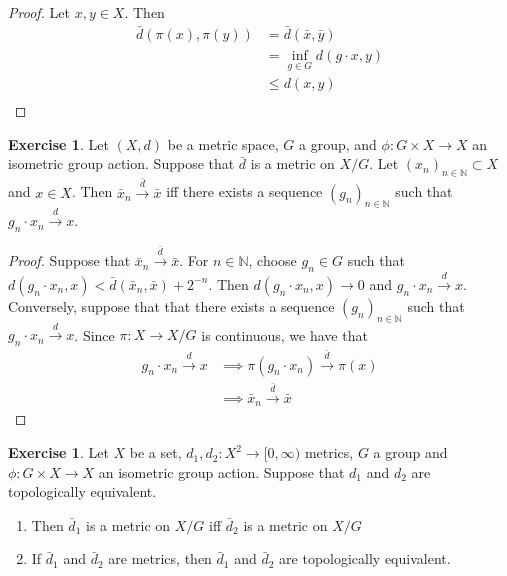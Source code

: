 \documentclass[12pt]{amsart}
\theoremstyle{definition}
\newtheorem{ex}[definition]{Exercise}
\newcommand{\N}{\mathbb{N}}
\newcommand{\Rg}{[0,\infty)}
\newcommand{\conv}[1]{\xrightarrow{#1}}
\DeclareMathOperator*{\0}{\mbf{0}}
\DeclareMathOperator*{\1}{\mbf{1}}
\newcommand{\lex}[1]{\label{ex:#1}}
\begin{document}
	\begin{proof}
	Let $x,y \in X$. Then
	\begin{align*}
	\bar{d}(\pi(x), \pi(y)) 
	&= \bar{d}(\bar{x}, \bar{y}) \\
	&= \inf_{g \in G} d(g \cdot x, y)\\
	& \leq d(x,y)  \\
	\end{align*}
	\end{proof}
	
	\begin{ex} \lex{}
	Let $(X, d)$ be a metric space, $G$ a group, and $\phi: G \times X \rightarrow X$ an isometric group action. Suppose that $\bar{d}$ is a metric on $X/G$. Let $(x_n)_{n \in \N} \subset X$ and $x \in X$. Then $\bar{x}_n \conv{\bar{d}} \bar{x}$ iff there exists a sequence $(g_n)_{n \in \N}$ such that $g_n \cdot x_n \conv{d} x$.
	\end{ex}
	
	\begin{proof} 
	Suppose that $\bar{x}_n \conv{\bar{d}} \bar{x}$. For $n \in \N$, choose $g_n \in G$ such that $d(g_n \cdot x_n, x) < \bar{d}(\bar{x}_n, \bar{x}) + 2^{-n}$. Then $d(g_n \cdot x_n, x) \rightarrow 0$ and $g_n \cdot x_n \conv{d} x$.  \\
	Conversely, suppose that that there exists a sequence $(g_n)_{n \in \N}$ such that $g_n \cdot x_n \conv{d} x$. Since $\pi:X \rightarrow X/G$ is continuous, we have that
	\begin{align*}
	g_n \cdot x_n \conv{d} x
	& \implies \pi(g_n \cdot x_n) \conv{\bar{d}} \pi(x)\\
	& \implies \bar{x}_n  \conv{\bar{d}} \bar{x}
	\end{align*}
	\end{proof}		
	
	\begin{ex} \lex{}
	Let $X$ be a set, $d_1, d_2: X^2 \rightarrow \Rg$ metrics, $G$ a group and $\phi: G \times X \rightarrow X$ an isometric group action. Suppose that $d_1$ and $d_2$ are topologically equivalent. 
	\begin{enumerate}
	\item Then $\bar{d}_1$ is a metric on $X/G$ iff $\bar{d}_2$ is a metric on $X/G$
	\item If $\bar{d}_1$ and $\bar{d}_2$ are metrics, then $\bar{d}_1$ and $\bar{d}_2$ are topologically equivalent. 
	\end{enumerate}
	\end{ex}
	
\end{document}
